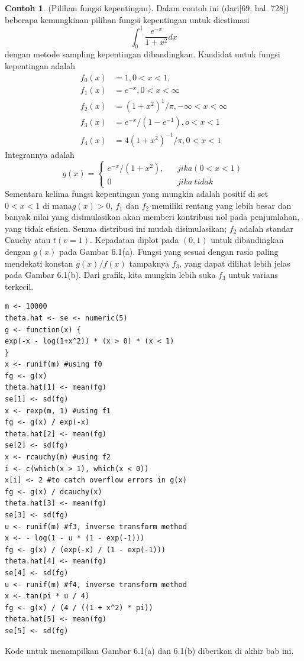 \documentclass[a4paper,12pt]{article}
\theoremstyle{definition}
\newtheorem{example}{Contoh}[section]
\begin{document}
\begin{example}
        (Pilihan fungsi kepentingan). Dalam contoh ini (dari[69, hal. 728]) beberapa kemungkinan pilihan fungsi kepentingan untuk diestimasi
        \begin{equation*}
            \int_{0}^{1}\frac{e^{-x}}{1+x^{2}}dx
        \end{equation*}
        dengan metode sampling kepentingan dibandingkan. Kandidat untuk fungsi kepentingan adalah
        \begin{equation*}
            \begin{split}
                f_{0}(x)&=1, 0<x<1,\\
                f_{1}(x)&=e^{-x},0<x<\infty\\
                f_{2}(x)&=(1+x^{2})^{1}/\pi,-\infty<x<\infty\\
                f_{3}(x)&=e^{-x}/(1-e^{-1}),o<x<1\\
                f_{4}(x)&=4(1+x^{2})^{-1}/\pi,0<x<1
            \end{split}
        \end{equation*}
        Integrannya adalah
        \begin{equation*}
            g(x)=\left\{\begin{matrix}
            e^{-x}/(1+x^{2}),  &  &jika (0<x<1) \\ 
            0 &  & jika \ tidak
            \end{matrix}\right.
        \end{equation*}
        Sementara kelima fungsi kepentingan yang mungkin adalah positif di set $0 < x < 1$ di mana$ g(x) > 0$, $f_{1}$ dan $f_{2}$ memiliki rentang yang lebih besar dan banyak nilai yang disimulasikan akan memberi kontribusi nol pada penjumlahan, yang tidak efisien. Semua distribusi ini mudah disimulasikan; $f_{2}$ adalah standar Cauchy atau $t(v=1)$.
        Kepadatan diplot pada $(0,1)$ untuk dibandingkan dengan $g(x)$ pada Gambar 6.1(a). Fungsi yang sesuai dengan rasio paling mendekati konstan $g(x)/f(x)$ tampaknya $f_{3}$, yang dapat dilihat lebih jelas pada Gambar 6.1(b). Dari grafik, kita mungkin lebih suka $f_{3}$ untuk varians terkecil.
\begin{lstlisting}
m <- 10000
theta.hat <- se <- numeric(5)
g <- function(x) {
exp(-x - log(1+x^2)) * (x > 0) * (x < 1)
}
x <- runif(m) #using f0
fg <- g(x)
theta.hat[1] <- mean(fg)
se[1] <- sd(fg)
x <- rexp(m, 1) #using f1
fg <- g(x) / exp(-x)
theta.hat[2] <- mean(fg)
se[2] <- sd(fg)
x <- rcauchy(m) #using f2
i <- c(which(x > 1), which(x < 0))
x[i] <- 2 #to catch overflow errors in g(x)
fg <- g(x) / dcauchy(x)
theta.hat[3] <- mean(fg)
se[3] <- sd(fg)
u <- runif(m) #f3, inverse transform method
x <- - log(1 - u * (1 - exp(-1)))
fg <- g(x) / (exp(-x) / (1 - exp(-1)))
theta.hat[4] <- mean(fg)
se[4] <- sd(fg)
u <- runif(m) #f4, inverse transform method
x <- tan(pi * u / 4)
fg <- g(x) / (4 / ((1 + x^2) * pi))
theta.hat[5] <- mean(fg)
se[5] <- sd(fg)
\end{lstlisting}
        Kode untuk menampilkan Gambar 6.1(a) dan 6.1(b) diberikan di akhir bab ini.
        

\end{example}
\end{document}
